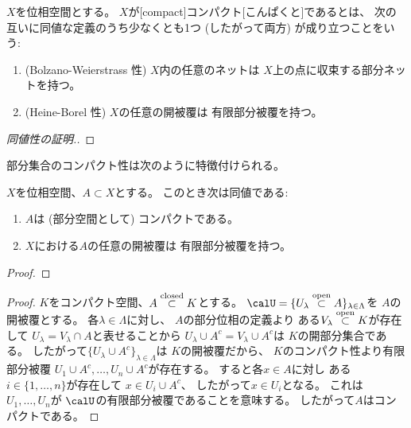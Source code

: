 \documentclass[report]{jlreq}
\begin{document}
\begin{definition}[コンパクト]
    $X$を位相空間とする。
    $X$が[compact]{コンパクト}[こんぱくと]であるとは、
    次の互いに同値な定義のうち少なくとも1つ (したがって両方)
    が成り立つことをいう:
    \begin{enumerate}
        \item (Bolzano-Weierstrass 性)
            $X$内の任意のネットは
            $X$上の点に収束する部分ネットを持つ。
        \item (Heine-Borel 性)
            $X$の任意の開被覆は
            有限部分被覆を持つ。
    \end{enumerate}
\end{definition}

\begin{proof}[同値性の証明.]
    \TODO{}
\end{proof}

部分集合のコンパクト性は次のように特徴付けられる。

\begin{proposition}[部分集合のコンパクト性の特徴付け]
    $X$を位相空間、$A \subset X$とする。
    このとき次は同値である:
    \begin{enumerate}
        \item $A$は (部分空間として) コンパクトである。
        \item $X$における$A$の任意の開被覆は
            有限部分被覆を持つ。
    \end{enumerate}
\end{proposition}

\begin{proof}
    \TODO{}
\end{proof}


\begin{proof}
    $K$をコンパクト空間、$A \stackrel{\text{closed}}{\subset} K$とする。
    $\calU = \{ U_\lambda \opensubset A \}_{\lambda \in \Lambda}$を
    $A$の開被覆とする。
    各$\lambda \in \Lambda$に対し、
    $A$の部分位相の定義より
    ある$V_\lambda \stackrel{\text{open}}{\subset} K$が存在して
    $U_\lambda = V_\lambda \cap A$と表せることから
    $U_\lambda \cup A^c = V_\lambda \cup A^c$は
    $K$の開部分集合である。
    したがって$\{ U_\lambda \cup A^c \}_{\lambda \in \Lambda}$は
    $K$の開被覆だから、
    $K$のコンパクト性より有限部分被覆
    $U_1 \cup A^c, \dots, U_n \cup A^c$が存在する。
    すると各$x \in A$に対し
    ある$i \in \{ 1, \dots, n \}$が存在して
    $x \in U_i \cup A^c$、
    したがって$x \in U_i$となる。
    これは$U_1, \dots, U_n$が
    $\calU$の有限部分被覆であることを意味する。
    したがって$A$はコンパクトである。
\end{proof}
\end{document}
